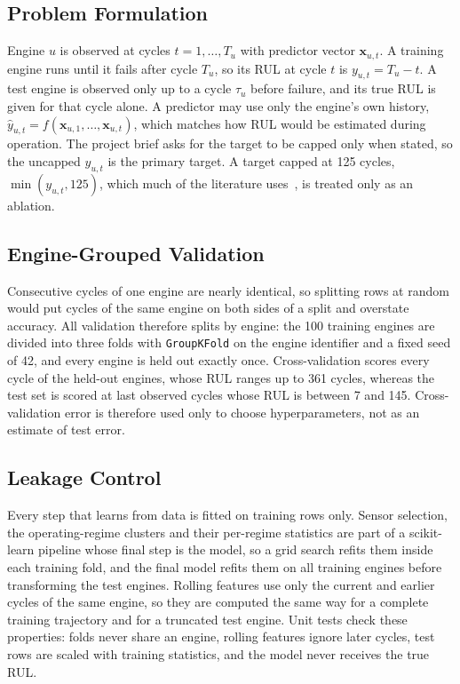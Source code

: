 \subsection{Problem Formulation}
Engine $u$ is observed at cycles $t=1,\dots,T_u$ with predictor vector
$\mathbf{x}_{u,t}$. A training engine runs until it fails after cycle $T_u$, so
its RUL at cycle $t$ is $y_{u,t}=T_u-t$. A test engine is observed only up to a
cycle $\tau_u$ before failure, and its true RUL is given for that cycle alone.
A predictor may use only the engine's own history,
$\hat{y}_{u,t}=f(\mathbf{x}_{u,1},\dots,\mathbf{x}_{u,t})$, which matches how RUL
would be estimated during operation. The project brief asks for the target to be
capped only when stated, so the uncapped $y_{u,t}$ is the primary target. A
target capped at 125 cycles, $\min(y_{u,t},125)$, which much of the literature
uses~\cite{Heimes2008recurrent,Zheng2017long}, is treated only as an ablation.

\subsection{Engine-Grouped Validation}
Consecutive cycles of one engine are nearly identical, so splitting rows at
random would put cycles of the same engine on both sides of a split and
overstate accuracy. All validation therefore splits by engine: the 100 training
engines are divided into three folds with \texttt{GroupKFold} on the engine
identifier and a fixed seed of 42, and every engine is held out exactly once.
Cross-validation scores every cycle of the held-out engines, whose RUL ranges up
to 361 cycles, whereas the test set is scored at last observed cycles whose RUL
is between 7 and 145. Cross-validation error is therefore used only to choose
hyperparameters, not as an estimate of test error.

\subsection{Leakage Control}
Every step that learns from data is fitted on training rows only. Sensor
selection, the operating-regime clusters and their per-regime statistics are
part of a scikit-learn pipeline whose final step is the model, so a grid search
refits them inside each training fold, and the final model refits them on all
training engines before transforming the test engines. Rolling features use
only the current and earlier cycles of the same engine, so they are computed
the same way for a complete training trajectory and for a truncated test
engine. Unit tests check these properties: folds never share an engine, rolling
features ignore later cycles, test rows are scaled with training statistics,
and the model never receives the true RUL.

